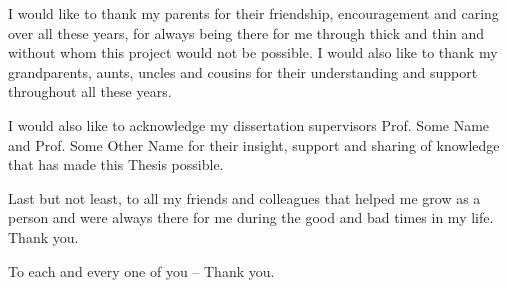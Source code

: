 
I would like to thank my parents for their friendship, encouragement and caring over all these years, for always being there for me through thick and thin and without whom this project would not be possible. I would also like to thank my grandparents, aunts, uncles and cousins for their understanding and support throughout all these years.

I would also like to acknowledge my dissertation supervisors Prof. Some Name and Prof. Some Other Name for their insight, support and sharing of knowledge that has made this Thesis possible.

Last but not least, to all my friends and colleagues that helped me grow as a person and were always there for me during the good and bad times in my life. Thank you.

To each and every one of you -- Thank you.